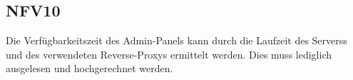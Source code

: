 \subsection*{NFV10}

Die Verfügbarkeitszeit des \Gls{Admin-Panel}s kann durch die Laufzeit des \Glspl{Server}s und des verwendeten \Gls{Reverse-Proxy}s ermittelt werden.
Dies muss lediglich ausgelesen und hochgerechnet werden.